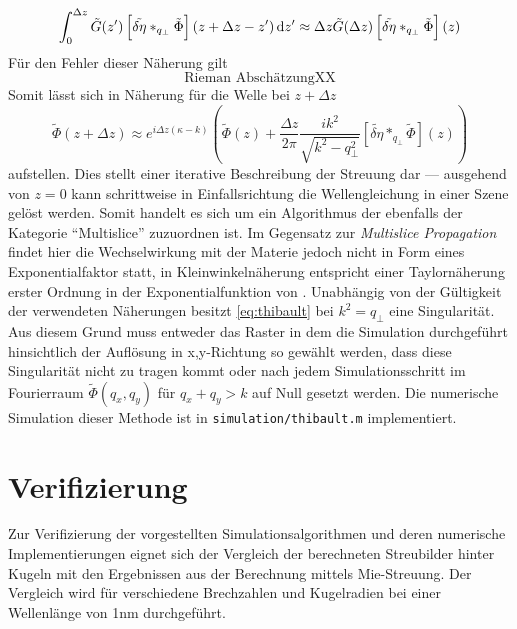 \begin{equation}
	\int_{0}^{\Delta z} \tilde{G}(z')\left[\tilde{\delta\eta}\ast_{q_\perp} \tilde{\Phi}\right](z+\Delta z-z')\dif z'
	\approx
	\Delta z \tilde{G}(\Delta z)\left[\tilde{\delta\eta}\ast_{q_\perp} \tilde{\Phi}\right](z)
\end{equation}
Für den Fehler dieser Näherung gilt
\begin{equation}
	\text{Rieman AbschätzungXX}
\end{equation}
Somit lässt sich in Näherung für die Welle bei $z+\Delta z$
\begin{equation}
	\label{eq:thibault}
	\tilde{\Phi}(z+\Delta z)
	\approx
	e^{i\Delta z(\kappa-k)}
	\left(
	\tilde{\Phi}(z)+\frac{\Delta z}{2\pi}\frac{ik^2}{\sqrt{k^2-q^2_\perp}}  \left[\tilde{\delta\eta}\ast_{q_\perp} \tilde{\Phi}\right](z)
	\right)
\end{equation}
aufstellen. Dies stellt einer iterative Beschreibung der Streuung dar --- ausgehend von $z=0$ kann schrittweise in Einfallsrichtung die Wellengleichung in einer Szene gelöst werden. Somit handelt es sich um ein Algorithmus der ebenfalls der Kategorie "`Multislice"' zuzuordnen ist. Im Gegensatz zur \textit{Multislice Propagation} findet hier die Wechselwirkung mit der Materie jedoch nicht in Form eines Exponentialfaktor statt, in Kleinwinkelnäherung entspricht  einer Taylornäherung erster Ordnung in der Exponentialfunktion von . Unabhängig von der Gültigkeit der verwendeten Näherungen besitzt \eqref{eq:thibault} bei $k^2=q_\perp$ eine Singularität. Aus diesem Grund muss entweder das Raster in dem die Simulation durchgeführt hinsichtlich der Auflösung in x,y-Richtung so gewählt werden, dass diese Singularität nicht zu tragen kommt oder nach jedem Simulationsschritt im Fourierraum $\tilde{\Phi}(q_x,q_y)$ für $q_x+q_y>k$ auf Null gesetzt werden.
Die numerische Simulation dieser Methode ist in \texttt{simulation/thibault.m} implementiert.


\section{Verifizierung}
Zur Verifizierung der vorgestellten Simulationsalgorithmen und deren numerische Implementierungen eignet sich der Vergleich der berechneten Streubilder hinter Kugeln mit den Ergebnissen aus der Berechnung mittels Mie-Streuung. Der Vergleich wird für verschiedene Brechzahlen und Kugelradien bei einer Wellenlänge von 1\si{nm} durchgeführt.

